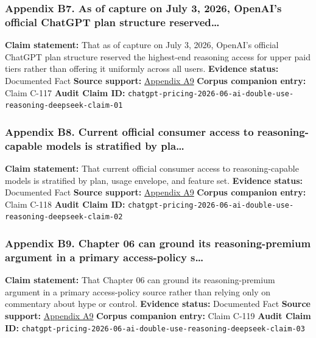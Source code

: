 \documentclass[
  american,
  11pt,
  letterpaper,
]{article}
\begin{document}
\subsubsection{Appendix B7. As of capture on July 3, 2026, OpenAI's
official ChatGPT plan structure
reserved\ldots{}}\label{ch-06-appendix-b7-as-of-capture-on-july-3-2026-openai-s-official-chatgpt-plan-structure-reserved}

\textbf{Claim statement:} That as of capture on July 3, 2026, OpenAI's
official ChatGPT plan structure reserved the highest-end reasoning
access for upper paid tiers rather than offering it uniformly across all
users. \textbf{Evidence status:} Documented Fact \textbf{Source
support:}
\hyperref[ch-06-appendix-a9-chatgpt-plans-free-go-plus-pro-business-and-enterprise]{Appendix
A9} \textbf{Corpus companion entry:} Claim C-117 \textbf{Audit Claim
ID:}
\texttt{chatgpt-pricing-2026-06-ai-double-use-reasoning-deepseek-claim-01}

\subsubsection{Appendix B8. Current official consumer access to
reasoning-capable models is stratified by
pla\ldots{}}\label{ch-06-appendix-b8-current-official-consumer-access-to-reasoning-capable-models-is-stratified-by-pla}

\textbf{Claim statement:} That current official consumer access to
reasoning-capable models is stratified by plan, usage envelope, and
feature set. \textbf{Evidence status:} Documented Fact \textbf{Source
support:}
\hyperref[ch-06-appendix-a9-chatgpt-plans-free-go-plus-pro-business-and-enterprise]{Appendix
A9} \textbf{Corpus companion entry:} Claim C-118 \textbf{Audit Claim
ID:}
\texttt{chatgpt-pricing-2026-06-ai-double-use-reasoning-deepseek-claim-02}

\subsubsection{Appendix B9. Chapter 06 can ground its reasoning-premium
argument in a primary access-policy
s\ldots{}}\label{ch-06-appendix-b9-chapter-06-can-ground-its-reasoning-premium-argument-in-a-primary-access-policy-s}

\textbf{Claim statement:} That Chapter 06 can ground its
reasoning-premium argument in a primary access-policy source rather than
relying only on commentary about hype or control. \textbf{Evidence
status:} Documented Fact \textbf{Source support:}
\hyperref[ch-06-appendix-a9-chatgpt-plans-free-go-plus-pro-business-and-enterprise]{Appendix
A9} \textbf{Corpus companion entry:} Claim C-119 \textbf{Audit Claim
ID:}
\texttt{chatgpt-pricing-2026-06-ai-double-use-reasoning-deepseek-claim-03}
\end{document}
